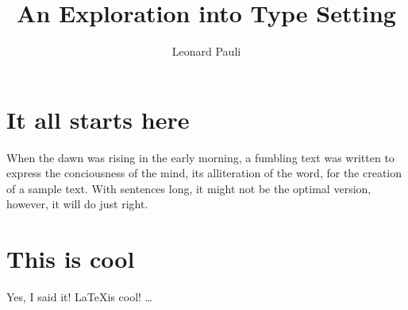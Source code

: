 \documentclass[a4paper,11pt]{article}
\author{Leonard Pauli}
\title{An Exploration into Type Setting}
\begin{document}
\maketitle
\tableofcontents
\section{It all starts here}
When the dawn was rising in the early morning, a fumbling text was written to express the conciousness of the mind, its alliteration of the word, for the creation of a sample text. With sentences long, it might not be the optimal version, however, it will do just right.
\section{This is cool}
Yes, I said it! \LaTeX is cool!
\ldots
\end{document}

